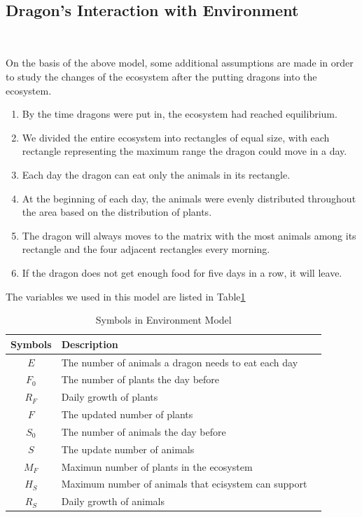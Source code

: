 \documentclass{mcmthesis}
\begin{document}
~\ \
\subsection{Dragon's Interaction with Environment}
~\ \

On the basis of the above model, some additional assumptions are made in order to study the changes of the ecosystem after the putting dragons into the ecosystem.
\begin{enumerate}
    \item By the time dragons were put in, the ecosystem had reached equilibrium.
    \item We divided the entire ecosystem into rectangles of equal size, with each rectangle representing the maximum range the dragon could move in a day.
    \item Each day the dragon can eat only the animals in its rectangle.
    \item At the beginning of each day, the animals were evenly distributed throughout the area based on the distribution of plants.
    \item The dragon will always moves to the matrix with the most animals among its rectangle and the four adjacent rectangles every morning.
    \item If the dragon does not get enough food for five days in a row, it will leave.
\end{enumerate}

The variables we used in this model are listed in Table\ref{tb:Variables4}


\begin{table}[h]
\centering
\caption{Symbols in Environment Model}
\begin{tabular}{cll}
\toprule
\textbf{Symbols}   & \textbf{Description}                                   \\
\midrule
$E$                & The number of animals a dragon needs to eat each day   \\
$F_{0}$            & The number of plants the day before                    \\
$R_{F}$            & Daily growth of plants                                 \\
$F$                & The updated number of plants                           \\
$S_{0}$            & The number of animals the day before                   \\
$S$                & The update number of animals                           \\
$M_{F}$            & Maximun number of plants in the ecosystem              \\
$H_{S}$            & Maximum number of animals that ecisystem can support   \\
$R_{S}$            & Daily growth of animals                                \\
\bottomrule
\end{tabular}\label{tb:Variables4}
\end{table}
\end{document}
